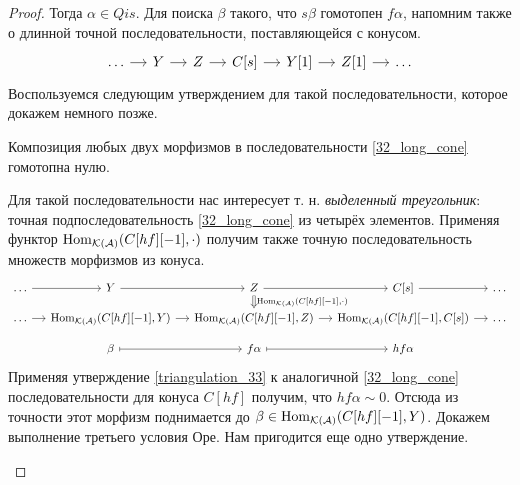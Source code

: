 \documentclass[../main.tex]{subfiles}
\begin{document}
\begin{proof}
Тогда $\alpha \in Qis$. Для поиска $\beta$ такого, что $s\beta$ гомотопен $f\alpha$, напомним также о длинной точной последовательности, поставляющейся с конусом.
    \begin{equation}\label{32_long_cone}
        \begin{tikzcd}[sep=small]
	\ldots&Y&Z& {C[s]} & Y[1]&Z[1]&\ldots
	\arrow[from=1-2, to=1-3]
	\arrow[from=1-3, to=1-4]
 \arrow[from=1-1, to=1-2]
 \arrow[from=1-4, to=1-5]
 \arrow[from=1-5, to=1-6]
 \arrow[from=1-6, to=1-7]
\end{tikzcd}
    \end{equation}
Воспользуемся следующим утверждением для такой последовательности, которое докажем немного позже.

\begin{to_lem}\label{triangulation_33}
Композиция любых двух морфизмов в последовательности \eqref{32_long_cone} гомотопна нулю.
\end{to_lem}
Для такой последовательности нас интересует т. н. \emph{выделенный треугольник}: точная подпоследовательность \eqref{32_long_cone} из четырёх элементов. Применяя функтор $\operatorname{Hom}_{\mathcal{K}(\mathcal{A})}(C[hf][-1], \cdot)$ получим также точную последовательность множеств морфизмов из конуса.
    \begin{equation*}
       \begin{tikzcd}[sep=small]
	\ldots & Y & Z & {C[s]} & \ldots \\
	\ldots & {\Hom_{\mathcal{K}(\mathcal{A})}(C[hf][-1], Y)} & {\Hom_{\mathcal{K}(\mathcal{A})}(C[hf][-1], Z)} & {\Hom_{\mathcal{K}(\mathcal{A})}(C[hf][-1], C[s])} & \ldots \\
	& \beta & f\alpha & hf\alpha
	\arrow[from=1-2, to=1-3]
	\arrow[from=1-3, to=1-4]
	\arrow["{\Hom_{\mathcal{K}(\mathcal{A})}(C[hf][-1], \cdot)}", Rightarrow, from=1-3, to=2-3]
	\arrow[from=2-2, to=2-3]
	\arrow[from=2-3, to=2-4]
	\arrow[maps to, from=3-3, to=3-4]
	\arrow[maps to, from=3-2, to=3-3]
	\arrow[from=1-4, to=1-5]
	\arrow[from=1-1, to=1-2]
	\arrow[from=2-1, to=2-2]
	\arrow[from=2-4, to=2-5]
\end{tikzcd}
    \end{equation*}
Применяя утверждение \ref{triangulation_33} к аналогичной \eqref{32_long_cone} последовательности для конуса $C[hf]$ получим, что $hf\alpha \sim 0$. Отсюда из точности этот морфизм поднимается до $\beta \in \operatorname{Hom}_{\mathcal{K}(\mathcal{A})}(C[hf][-1], Y)$.
Докажем выполнение третьего условия Оре. Нам пригодится еще одно утверждение.
\begin{to_lem}\label{32_additive_loc}

\end{to_lem}
\end{proof}
\end{document}

